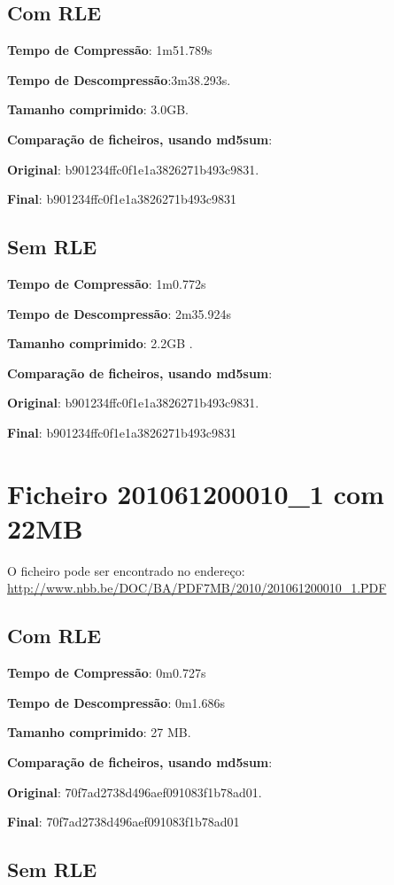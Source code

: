 \documentclass[11pt,a4paper]{report}
\begin{document}
\subsection{Com RLE}
\textbf{Tempo de Compressão}: 1m51.789s

\textbf{Tempo de Descompressão}:3m38.293s.

\textbf{Tamanho comprimido}: 3.0GB.

\textbf{Comparação de ficheiros, usando md5sum}:

\textbf{Original}: b901234ffc0f1e1a3826271b493c9831.

\textbf{Final}: b901234ffc0f1e1a3826271b493c9831


\subsection{Sem RLE}

\textbf{Tempo de Compressão}: 1m0.772s

\textbf{Tempo de Descompressão}: 2m35.924s

\textbf{Tamanho comprimido}: 2.2GB .

\textbf{Comparação de ficheiros, usando md5sum}:

\textbf{Original}: b901234ffc0f1e1a3826271b493c9831.

\textbf{Final}: b901234ffc0f1e1a3826271b493c9831



\section{Ficheiro  201061200010\_1 com 22MB}
O ficheiro pode ser encontrado no endereço:\\ \url{http://www.nbb.be/DOC/BA/PDF7MB/2010/201061200010_1.PDF}


\subsection{Com RLE}
\textbf{Tempo de Compressão}: 0m0.727s

\textbf{Tempo de Descompressão}: 0m1.686s

\textbf{Tamanho comprimido}: 27 MB.

\textbf{Comparação de ficheiros, usando md5sum}:

\textbf{Original}: 70f7ad2738d496aef091083f1b78ad01.

\textbf{Final}: 70f7ad2738d496aef091083f1b78ad01


\subsection{Sem RLE}
\end{document}
